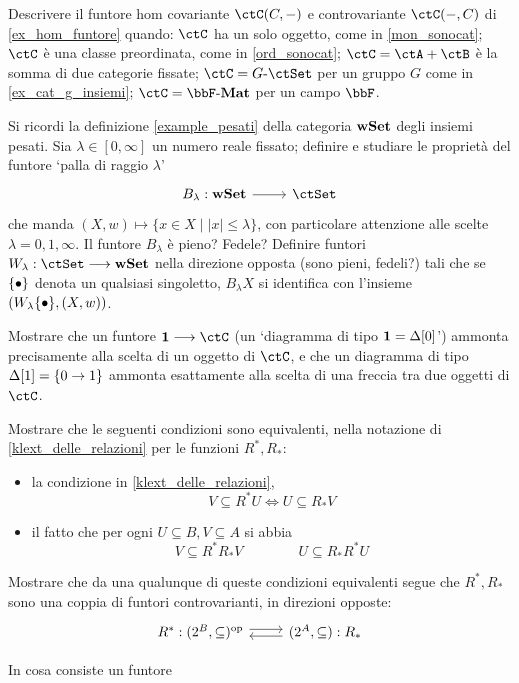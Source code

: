 \begin{esercizi}
	\item Descrivere il funtore hom covariante \(\Hom\ctC(C,-)\) e controvariante \(\Hom\ctC(-,C)\) di \ref{ex_hom_funtore} quando: \(\ctC\) ha un solo oggetto, come in \ref{mon_sonocat}; \(\ctC\) è una classe preordinata, come in \ref{ord_sonocat}; \(\ctC = \ctA+\ctB\) è la somma di due categorie fissate; \(\ctC = G\emdash\ctSet\) per un gruppo \(G\) come in \ref{ex_cat_g_insiemi}; \(\ctC = \ctMat\) per un campo \(\bbF\).
	\item Si ricordi la definizione \ref{example_pesati} della categoria \(\mathbf{wSet}\) degli insiemi pesati. Sia \(\lambda\in[0,\infty]\) un numero reale fissato; definire e studiare le proprietà del funtore `palla di raggio \(\lambda\)'
	\[\dmFun{B_\lambda}{\cate{wSet}}{\ctSet}\]
	che manda \((X,w)\mapsto \{x\in X\mid |x|\le \lambda\}\), con particolare attenzione alle scelte \(\lambda=0,1,\infty\). Il funtore \(B_\lambda\) è pieno? Fedele? Definire funtori \(W_\lambda : \ctSet \fun\cate{wSet}\) nella direzione opposta (sono pieni, fedeli?) tali che se \(\{\bullet\}\) denota un qualsiasi singoletto, \(B_\lambda X\) si identifica con l'insieme \((W_\lambda\{\bullet\},(X,w))\).
	\item \label{gfdpgubai_1} Mostrare che un funtore \(\ctTerm \fun\ctC\) (un `diagramma di tipo \(\mathbf{1} = \Delta[0]\)') ammonta precisamente alla scelta di un oggetto di \(\ctC\), e che un diagramma di tipo \(\Delta[1] = \{0\to 1\}\) ammonta esattamente alla scelta di una freccia tra due oggetti di \(\ctC\).
	\item \label{gfdpgubai_2} Mostrare che le seguenti condizioni sono equivalenti, nella notazione di \ref{klext_delle_relazioni} per le funzioni \(R^*,R_*\):
	\begin{itemize}
		\item la condizione in \ref{klext_delle_relazioni},
		      \[V\subseteq R^*U\iff U\subseteq R_*V\]
		\item il fatto che per ogni \(U\subseteq B,V\subseteq A\) si abbia
		      \[V\subseteq R^*R_*V\qquad\qquad U\subseteq R_*R^*U\]
	\end{itemize}
	Mostrare che da una qualunque di queste condizioni equivalenti segue che \(R^*,R_*\) sono una coppia di funtori controvarianti, in direzioni opposte:
	\[\begin{tikzcd}
			R^* : (\pow B,\subseteq)^\op \ar[r, shift left] & (\pow A,\subseteq) : R_* \ar[l, shift left]
		\end{tikzcd}\]
	\item \label{gfdpgubai_3} In cosa consiste un funtore

\end{esercizi}
